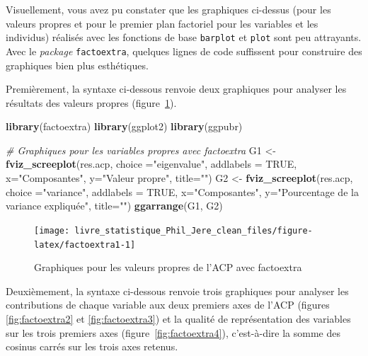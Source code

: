 \documentclass[
  11pt,
  french,
]{book}
\makeatletter
\newenvironment{Shaded}{\begin{snugshade}}{\end{snugshade}}
\newcommand{\CommentTok}[1]{\textcolor[rgb]{0.56,0.35,0.01}{\textit{#1}}}
\newcommand{\DataTypeTok}[1]{\textcolor[rgb]{0.13,0.29,0.53}{#1}}
\newcommand{\KeywordTok}[1]{\textcolor[rgb]{0.13,0.29,0.53}{\textbf{#1}}}
\newcommand{\NormalTok}[1]{#1}
\newcommand{\OtherTok}[1]{\textcolor[rgb]{0.56,0.35,0.01}{#1}}
\newcommand{\StringTok}[1]{\textcolor[rgb]{0.31,0.60,0.02}{#1}}
\newenvironment{kframe}{%
\medskip{}
\setlength{\fboxsep}{.8em}
 \def\at@end@of@kframe{}%
 \ifinner\ifhmode%
  \def\at@end@of@kframe{\end{minipage}}%
  \begin{minipage}{\columnwidth}%
 \fi\fi%
 \def\FrameCommand##1{\hskip\@totalleftmargin \hskip-\fboxsep
 \colorbox{shadecolor}{##1}\hskip-\fboxsep
     \hskip-\linewidth \hskip-\@totalleftmargin \hskip\columnwidth}%
 \MakeFramed {\advance\hsize-\width
   \@totalleftmargin\z@ \linewidth\hsize
   \@setminipage}}%
 {\par\unskip\endMakeFramed%
 \at@end@of@kframe}
\renewenvironment{Shaded}{\begin{kframe}}{\end{kframe}}
\makeatother
\begin{document}
Visuellement, vous avez pu constater que les graphiques ci-dessus (pour les valeurs propres et pour le premier plan factoriel pour les variables et les individus) réalisés avec les fonctions de base \texttt{barplot} et \texttt{plot} sont peu attrayants. Avec le \emph{package} \texttt{factoextra}, quelques lignes de code suffissent pour construire des graphiques bien plus esthétiques.

Premièrement, la syntaxe ci-dessous renvoie deux graphiques pour analyser les résultats des valeurs propres (figure~\ref{fig:factoextra1}).

\begin{Shaded}
\begin{Highlighting}[]
\KeywordTok{library}\NormalTok{(factoextra)}
\KeywordTok{library}\NormalTok{(ggplot2)}
\KeywordTok{library}\NormalTok{(ggpubr)}

\CommentTok{# Graphiques pour les variables propres avec factoextra}
\NormalTok{G1 <-}\StringTok{ }\KeywordTok{fviz_screeplot}\NormalTok{(res.acp, }\DataTypeTok{choice =}\StringTok{"eigenvalue"}\NormalTok{, }\DataTypeTok{addlabels =} \OtherTok{TRUE}\NormalTok{,}
                     \DataTypeTok{x=}\StringTok{"Composantes"}\NormalTok{,}
                     \DataTypeTok{y=}\StringTok{"Valeur propre"}\NormalTok{,}
                    \DataTypeTok{title=}\StringTok{""}\NormalTok{)}
\NormalTok{G2 <-}\StringTok{ }\KeywordTok{fviz_screeplot}\NormalTok{(res.acp, }\DataTypeTok{choice =}\StringTok{"variance"}\NormalTok{, }\DataTypeTok{addlabels =} \OtherTok{TRUE}\NormalTok{,}
                     \DataTypeTok{x=}\StringTok{"Composantes"}\NormalTok{,}
                     \DataTypeTok{y=}\StringTok{"Pourcentage de la variance expliquée"}\NormalTok{,}
                     \DataTypeTok{title=}\StringTok{""}\NormalTok{)}
\KeywordTok{ggarrange}\NormalTok{(G1, G2)}
\end{Highlighting}
\end{Shaded}

\begin{figure}

{\centering \texttt{[image: livre\_statistique\_Phil\_Jere\_clean\_files/figure-latex/factoextra1-1]} 

}

\caption{Graphiques pour les valeurs propres de l'ACP avec factoextra}\label{fig:factoextra1}
\end{figure}

Deuxièmement, la syntaxe ci-dessous renvoie trois graphiques pour analyser les contributions de chaque variable aux deux premiers axes de l'ACP (figures \ref{fig:factoextra2} et \ref{fig:factoextra3}) et la qualité de représentation des variables sur les trois premiers axes (figure~\ref{fig:factoextra4}), c'est-à-dire la somme des cosinus carrés sur les trois axes retenus.
\end{document}
